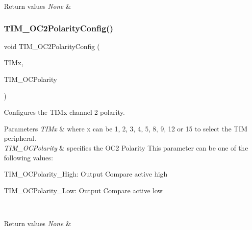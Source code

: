 \begin{DoxyRetVals}{Return values}
{\em None} & \\
\hline
\end{DoxyRetVals}
\mbox{\label{group___t_i_m___exported___functions_ga6831cacaac1ef50291af94db94450797}} 
\subsubsection{\texorpdfstring{TIM\_OC2PolarityConfig()}{TIM\_OC2PolarityConfig()}}
{\footnotesize\ttfamily void T\+I\+M\+\_\+\+O\+C2\+Polarity\+Config (\begin{DoxyParamCaption}\item[{\mbox{\hyperlink{struct_t_i_m___type_def}{T\+I\+M\+\_\+\+Type\+Def}} $\ast$}]{T\+I\+Mx,  }\item[{uint16\+\_\+t}]{T\+I\+M\+\_\+\+O\+C\+Polarity }\end{DoxyParamCaption})}



Configures the T\+I\+Mx channel 2 polarity. 


\begin{DoxyParams}{Parameters}
{\em T\+I\+Mx} & where x can be 1, 2, 3, 4, 5, 8, 9, 12 or 15 to select the T\+IM peripheral. \\
\hline
{\em T\+I\+M\+\_\+\+O\+C\+Polarity} & specifies the O\+C2 Polarity This parameter can be one of the following values\+: \begin{DoxyItemize}
\item T\+I\+M\+\_\+\+O\+C\+Polarity\+\_\+\+High\+: Output Compare active high \item T\+I\+M\+\_\+\+O\+C\+Polarity\+\_\+\+Low\+: Output Compare active low \end{DoxyItemize}
\\
\hline
\end{DoxyParams}

\begin{DoxyRetVals}{Return values}
{\em None} & \\
\hline
\end{DoxyRetVals}
\mbox{\label{group___t_i_m___exported___functions_ga75b4614c6dd2cd52f2c5becdb6590c10}} 
